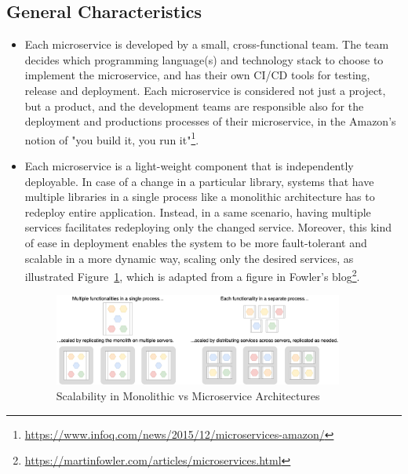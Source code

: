 \documentclass{Configuration_Files/PoliMi3i_thesis}
\begin{document}
\subsection{General Characteristics}
\label{subsec:chars}

\begin{itemize}
    \item Each microservice is developed by a small, cross-functional team.
    The team decides which programming language(s) and technology stack to choose to implement the microservice, and has their own CI/CD tools for testing, release and deployment.
    Each microservice is considered not just a project, but a product, and the development teams are responsible also for the deployment and productions processes of their microservice, in the Amazon's notion of "you build it, you run it"\footnote{\href{https://www.infoq.com/news/2015/12/microservices-amazon/}{https://www.infoq.com/news/2015/12/microservices-amazon/}}.
    
    \item Each microservice is a light-weight component that is independently deployable. 
    In case of a change in a particular library, systems that have multiple libraries in a single process like a monolithic architecture has to redeploy entire application. 
    Instead, in a same scenario, having multiple services facilitates redeploying only the changed service. Moreover, this kind of ease in deployment enables the system to be more fault-tolerant and scalable in a more dynamic way, scaling only the desired services, as illustrated Figure~\ref{fig:scalability}, which is adapted from a figure in Fowler's blog\footnote{\href{https://martinfowler.com/articles/microservices.html}{https://martinfowler.com/articles/microservices.html}}.
    
    \begin{figure}[H]
    \centering
    \includegraphics[width=0.90\textwidth]{myImages/scalability.png}
    \caption{Scalability in Monolithic vs Microservice Architectures}
    \label{fig:scalability}
    \end{figure}


\end{itemize}
\end{document}
